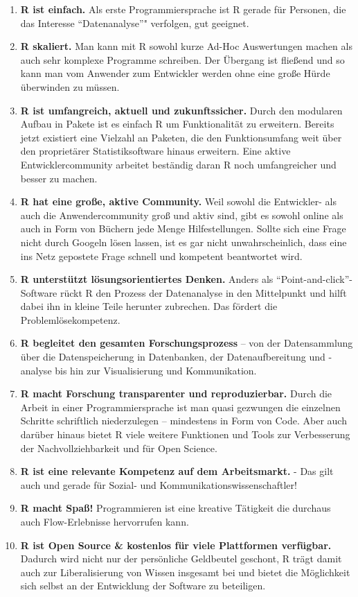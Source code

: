 \documentclass[
]{book}
\begin{document}
\begin{enumerate}
\def\labelenumi{\arabic{enumi}.}
\item
  \textbf{R ist einfach.} Als erste Programmiersprache ist R gerade für Personen, die das Interesse ``Datenanalyse''" verfolgen, gut geeignet.
\item
  \textbf{R skaliert.} Man kann mit R sowohl kurze Ad-Hoc Auswertungen machen als auch sehr komplexe Programme schreiben. Der Übergang ist fließend und so kann man vom Anwender zum Entwickler werden ohne eine große Hürde überwinden zu müssen.
\item
  \textbf{R ist umfangreich, aktuell und zukunftssicher.} Durch den modularen Aufbau in Pakete ist es einfach R um Funktionalität zu erweitern. Bereits jetzt existiert eine Vielzahl an Paketen, die den Funktionsumfang weit über den proprietärer Statistiksoftware hinaus erweitern. Eine aktive Entwicklercommunity arbeitet beständig daran R noch umfangreicher und besser zu machen.
\item
  \textbf{R hat eine große, aktive Community.} Weil sowohl die Entwickler- als auch die Anwendercommunity groß und aktiv sind, gibt es sowohl online als auch in Form von Büchern jede Menge Hilfestellungen. Sollte sich eine Frage nicht durch Googeln lösen lassen, ist es gar nicht unwahrscheinlich, dass eine ins Netz gepostete Frage schnell und kompetent beantwortet wird.
\item
  \textbf{R unterstützt lösungsorientiertes Denken.} Anders als ``Point-and-click''-Software rückt R den Prozess der Datenanalyse in den Mittelpunkt und hilft dabei ihn in kleine Teile herunter zubrechen. Das fördert die Problemlösekompetenz.
\item
  \textbf{R begleitet den gesamten Forschungsprozess} -- von der Datensammlung über die Datenspeicherung in Datenbanken, der Datenaufbereitung und -analyse bis hin zur Visualisierung und Kommunikation.
\item
  \textbf{R macht Forschung transparenter und reproduzierbar.} Durch die Arbeit in einer Programmiersprache ist man quasi gezwungen die einzelnen Schritte schriftlich niederzulegen -- mindestens in Form von Code. Aber auch darüber hinaus bietet R viele weitere Funktionen und Tools zur Verbesserung der Nachvollziehbarkeit und für Open Science.
\item
  \textbf{R ist eine relevante Kompetenz auf dem Arbeitsmarkt.} - Das gilt auch und gerade für Sozial- und Kommunikationswissenschaftler!
\item
  \textbf{R macht Spaß!} Programmieren ist eine kreative Tätigkeit die durchaus auch Flow-Erlebnisse hervorrufen kann.
\item
  \textbf{R ist Open Source \& kostenlos für viele Plattformen verfügbar.} Dadurch wird nicht nur der persönliche Geldbeutel geschont, R trägt damit auch zur Liberalisierung von Wissen insgesamt bei und bietet die Möglichkeit sich selbst an der Entwicklung der Software zu beteiligen.
\end{enumerate}
\end{document}
